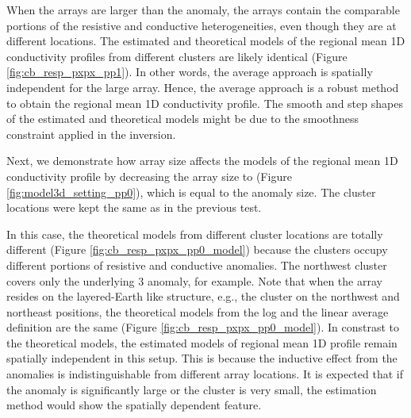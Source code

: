 When the arrays are larger than the anomaly, the arrays contain the comparable portions of the resistive and conductive heterogeneities, even though they are at different locations.
The estimated and theoretical models of the regional mean 1D conductivity profiles from different clusters are likely identical (Figure \ref{fig:cb_resp_pxpx_pp1}). 
In other words, the average approach is spatially independent for the large array. Hence, the average approach is a robust method to obtain the regional mean 1D conductivity profile.
The smooth and step shapes of the estimated and theoretical models might be due to the smoothness constraint applied in the inversion.





Next, we demonstrate how array size affects the models of the regional mean 1D conductivity profile by decreasing the array size to  (Figure \ref{fig:model3d_setting_pp0}), which is equal to the anomaly size. The cluster locations were kept the same as in the previous test.


	In this case, the theoretical models from different cluster locations are totally different (Figure \ref{fig:cb_resp_pxpx_pp0_model}) because 
the clusters occupy different portions of resistive and conductive anomalies.
The northwest cluster covers only the underlying 3 {\Ohmm} anomaly, for example.
Note that when the array resides on the layered-Earth like structure, e.g., the cluster on the northwest and northeast positions, the theoretical models from the log and the linear average definition are the same (Figure \ref{fig:cb_resp_pxpx_pp0_model}). 
	In constrast to the theoretical models, the estimated models of regional mean 1D profile remain spatially independent in this setup. This is because the inductive effect from the anomalies is indistinguishable from different array locations.
	It is expected that if the anomaly is significantly large or the cluster is very small, the estimation method would show the spatially dependent feature.

